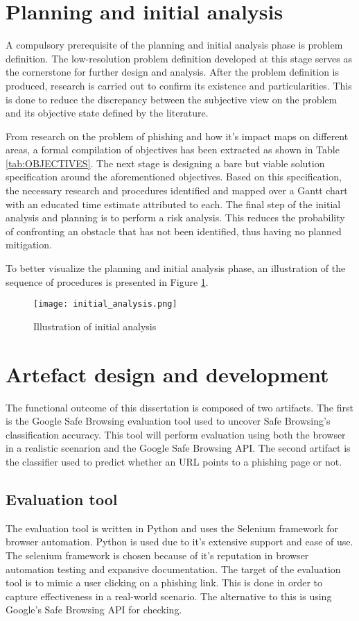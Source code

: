 \section{Planning and initial analysis}
A compulsory prerequisite of the planning and initial analysis phase is problem definition. The low-resolution problem definition developed at this stage serves as the cornerstone for further design and analysis. After the problem definition is produced, research is carried out to confirm its existence and particularities. This is done to reduce the discrepancy between the subjective view on the problem and its objective state defined by the literature.

From research on the problem of phishing and how it's impact maps on different areas, a formal compilation of objectives has been extracted as shown in Table \ref{tab:OBJECTIVES}. The next stage is designing a bare but viable solution specification around the aforementioned objectives. Based on this specification, the necessary research and procedures identified and mapped over a Gantt chart with an educated time estimate attributed to each. The final step of the initial analysis and planning is to perform a risk analysis. This reduces the probability of confronting an obstacle that has not been identified, thus having no planned mitigation.

To better visualize the planning and initial analysis phase, an illustration of the sequence of procedures is presented in Figure \ref{fig:INITIAL_ANALYSIS}.

\begin{figure}
	\centering
	\texttt{[image: initial\_analysis.png]}
	\caption{Illustration of initial analysis}
	\label{fig:INITIAL_ANALYSIS}
\end{figure}

\section{Artefact design and development}
The functional outcome of this dissertation is composed of two artifacts. The first is the Google Safe Browsing evaluation tool used to uncover Safe Browsing's classification accuracy. This tool will perform evaluation using both the browser in a realistic scenarion and the Google Safe Browsing API. The second artifact is the classifier used to predict whether an URL points to a phishing page or not.

\subsection{Evaluation tool}
The evaluation tool is written in Python and uses the Selenium framework for browser automation. Python is used due to it's extensive support and ease of use. The selenium framework is chosen because of it's reputation in browser automation testing and expansive documentation. The target of the evaluation tool is to mimic a user clicking on a phishing link. This is done in order to capture effectiveness in a real-world scenario. The alternative to this is using Google's Safe Browsing API for checking.

